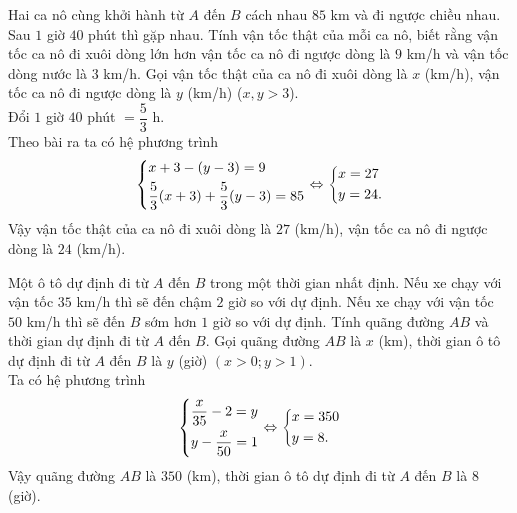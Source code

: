 \begin{bt}
	Hai ca nô cùng khởi hành từ $ A $ đến $ B $ cách nhau $ 85 $ km và đi ngược chiều nhau. Sau $ 1 $ giờ $ 40 $ phút thì gặp nhau. Tính vận tốc thật của mỗi ca nô, biết rằng vận tốc ca nô đi xuôi dòng lớn hơn vận tốc ca nô đi ngược dòng là $ 9 $ km/h và vận tốc dòng nước là $ 3 $ km/h.
	\loigiai
	{
		Gọi vận tốc thật của ca nô đi xuôi dòng là $ x $ (km/h), vận tốc ca nô đi ngược dòng là $ y $ (km/h) ($ x,y>3 $).\\
		Đổi $ 1 $ giờ $ 40 $ phút $ =\dfrac{5}{3} $ h.\\
		Theo bài ra ta có hệ phương trình
		\[\left\{\begin{aligned}&x+3-(y-3)=9\\&\dfrac{5}{3}(x+3)+\dfrac{5}{3}(y-3)=85\end{aligned}\right. \Leftrightarrow \left\{\begin{aligned}&x=27\\&y=24.\end{aligned}\right. \]
		Vậy vận tốc thật của ca nô đi xuôi dòng là $ 27 $ (km/h), vận tốc ca nô đi ngược dòng là $ 24 $ (km/h).
	}
\end{bt}

\begin{bt}
	Một ô tô dự định đi từ $ A $ đến $ B $ trong một thời gian nhất định. Nếu xe chạy với vận tốc $ 35 $ km/h thì sẽ đến chậm $ 2 $ giờ so với dự định. Nếu xe chạy với vận tốc $ 50 $ km/h thì sẽ đến $ B $ sớm hơn $ 1 $ giờ so với dự định. Tính quãng đường $ AB $ và thời gian dự định đi từ $ A $ đến $ B $.	
	\loigiai
	{
		Gọi quãng đường $ AB $ là $ x $ (km), thời gian ô tô dự định đi từ $ A $ đến $ B $ là $ y $ (giờ) $ (x > 0; y > 1) $.\\
		Ta có hệ phương trình
		\[\left\{\begin{aligned}&\dfrac{x}{35}-2=y\\&y-\dfrac{x}{50}=1\end{aligned}\right. \Leftrightarrow \left\{\begin{aligned}&x=350\\&y=8.\end{aligned}\right. \] 
		Vậy quãng đường $ AB $ là $ 350 $ (km), thời gian ô tô dự định đi từ $ A $ đến $ B $ là $ 8 $ (giờ).
	}
\end{bt}



